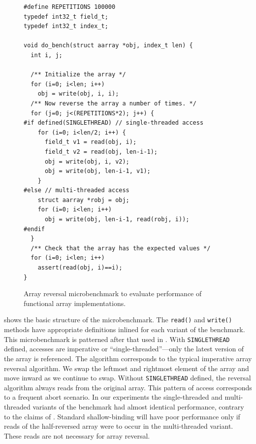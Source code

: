 \begin{figure}
\sis\fontsize{9}{10}\begin{verbatim}
#define REPETITIONS 100000
typedef int32_t field_t;
typedef int32_t index_t;

void do_bench(struct aarray *obj, index_t len) {
  int i, j;

  /** Initialize the array */
  for (i=0; i<len; i++)
    obj = write(obj, i, i);
  /** Now reverse the array a number of times. */
  for (j=0; j<(REPETITIONS*2); j++) {
#if defined(SINGLETHREAD) // single-threaded access
    for (i=0; i<len/2; i++) {
      field_t v1 = read(obj, i);
      field_t v2 = read(obj, len-i-1);
      obj = write(obj, i, v2);
      obj = write(obj, len-i-1, v1);
    }
#else // multi-threaded access
    struct aarray *robj = obj;
    for (i=0; i<len; i++)
      obj = write(obj, len-i-1, read(robj, i));
#endif
  }
  /** Check that the array has the expected values */
  for (i=0; i<len; i++)
    assert(read(obj, i)==i);
}
\end{verbatim}
\caption{Array reversal microbenchmark to evaluate performance of
  functional array implementations.}
\label{fig:array-bench}
\end{figure}

 shows the basic structure of the microbenchmark.
The \texttt{read()} and \texttt{write()} methods
have appropriate definitions inlined for each variant of the
benchmark.  This microbenchmark is patterned after that used in
\cite[p.507]{ONeillBu97}.  With \texttt{SINGLETHREAD} defined,
accesses are imperative or ``single-threaded''---only the latest
version of the array is referenced.  The algorithm corresponds to the
typical imperative array reversal algorithm.  We swap the leftmost and
rightmost element of the array and move inward as we continue to swap.
Without \texttt{SINGLETHREAD} defined,
the reversal algorithm always reads from the original
array.  This pattern of access corresponds to a frequent abort scenario.
In our experiments the single-threaded and multi-threaded variants of
the benchmark had almost identical performance, contrary to the claims
of \cite{ONeillBu97}.  Standard shallow-binding will have poor
performance only if reads of the half-reversed array were to occur in the
multi-threaded variant.  These reads are not necessary for array reversal.


